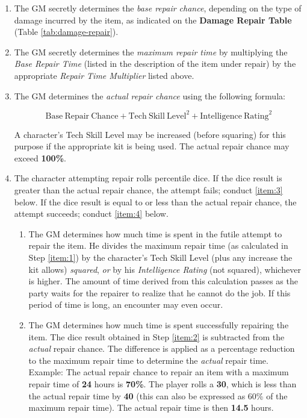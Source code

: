 \begin{enumerate}
\item The GM secretly determines the \emph{base repair chance}, depending on
  the type of damage incurred by the item, as indicated on the \textbf{Damage
  Repair Table} (Table \vref{tab:damage-repair}).
\item The GM secretly determines the \emph{maximum repair time} by
  multiplying the \emph{Base Repair Time} (listed in the description
  of the item under repair) by the appropriate \emph{Repair Time
    Multiplier} listed above.\label{item:1}
\item The  GM determines the  \emph{actual repair chance}  using the 
following formula:

$$\mathrm{Base\ Repair\ Chance} + \mathrm{Tech\ Skill\ Level}^2 +
   \mathrm{Intelligence\ Rating}^2$$
   
   A character's Tech Skill Level may be increased (before squaring)
   for this purpose if the appropriate kit is being used.  The actual
   repair chance may exceed \textbf{100\%}.
 \item The character attempting repair rolls percentile dice.
   \renewcommand{\theenumii}{\Alph{enumii}}  If the
   dice result is greater than the actual repair chance, the attempt
   fails; conduct \ref{item:3} below.  If the dice result is equal to or
   less than the actual repair chance, the attempt succeeds; conduct
   \ref{item:4} 
   below.\label{item:2}
   \begin{enumerate}
   \item The GM determines how much time is spent in the futile
     attempt to repair the item.  He divides the maximum repair time
     (as calculated in Step \ref{item:1}) by the character's Tech Skill Level
     (plus any increase the kit allows) \emph{squared}, \emph{or} by his
     \emph{Intelligence Rating} (not squared), whichever is higher.  The
     amount of time derived from this calculation passes as the party
     waits for the repairer to realize that he cannot do the job.  If
     this period of time is long, an encounter may even occur.\label{item:3}
   \item The GM determines how much time is spent successfully
     repairing the item.  The dice result obtained in Step
     \ref{item:2} is subtracted from the \emph{actual} repair chance.
     The difference is applied as a percentage reduction to the
     maximum repair time to determine the \emph{actual} repair time.
     Example: The actual repair chance to repair an item with a
     maximum repair time of \textbf{24} hours is \textbf{70\%}.  The
     player rolls a \textbf{30}, which is less than the actual repair
     time by \textbf{40} (this can also be expressed as 60\% of the
     maximum repair time).  The actual repair time is then \textbf{14.5}
     hours.\label{item:4}
   \end{enumerate}
\end{enumerate}
 
